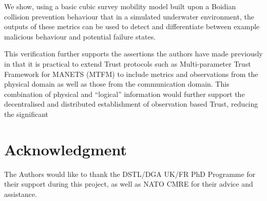 \documentclass[conference]{IEEEtran}
\begin{document}
We show, using a basic cubic survey mobility model built upon a Boidian collision prevention behaviour that in a simulated underwater environment, the outputs of these metrics can be used to detect and differentiate between example malicious behaviour and potential failure states.

This verification further supports the assertions the authors have made previously in \cite{Bolster2014}  that it is practical to extend Trust protocols such as Multi-parameter Trust Framework for MANETS (MTFM)\cite{Guo2012} to include metrics and observations from the physical domain as well as those from the communication domain. 
This combination of physical and ``logical'' information would further support the decentralised and distributed establishment of observation based Trust, reducing the significant 




\section*{Acknowledgment}

The Authors would like to thank the DSTL/DGA UK/FR PhD Programme for their support during this project, as well as NATO CMRE for their advice and assistance.




\end{document}
